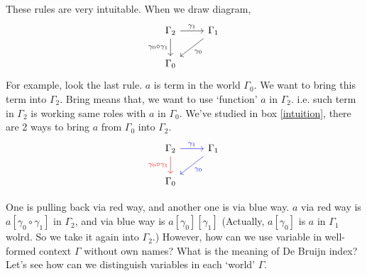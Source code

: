 \documentclass[12pt, a4paper, openany, twoside]{book}
\theoremstyle{definition}
\theoremstyle{remark}
\theoremstyle{plain}
\numberwithin{equation}{section}
\begin{document}
These rules are very intuitable. When we draw diagram, 
\[
\begin{tikzcd}
    \Gamma_2 \arrow[d, "\gamma_0 \circ \gamma_1"'] \arrow[r, "\gamma_1"] & \Gamma_1 \arrow[ld, "\gamma_0"] \\
    \Gamma_0
\end{tikzcd}
\]
For example, look the last rule. $a$ is term in the world $\Gamma_0$. We want to 
bring this term into $\Gamma_2$. Bring means that, we want to use \lq function' $a$ in $\Gamma_2$. i.e. such term in $\Gamma_2$ is 
working same roles with $a$ in $\Gamma_0$. We've studied in box \ref{intuition}, there are 2 ways to bring $a$ from $\Gamma_0$ into $\Gamma_2$. 
\[
\begin{tikzcd}
    \Gamma_2 \arrow[d, "\gamma_0 \circ \gamma_1"', red] \arrow[r, "\gamma_1", blue] & \Gamma_1 \arrow[ld, "\gamma_0", blue] \\
    \Gamma_0
\end{tikzcd}
\]

One is pulling back via red way, and another one is via blue way. $a$ via red way is $a[\gamma_0 \circ \gamma_1]$ in $\Gamma_2$, 
and via blue way is $a[\gamma_0][\gamma_1]$ (Actually, $a[\gamma_0]$ is $a$ in $\Gamma_1$ wolrd. So we take it again into $\Gamma_2$.)
However, how can we use variable in well-formed context $\Gamma$ without own names? What is the meaning of De Bruijn index? Let's see how can we distinguish
variables in each \lq world' $\Gamma$. 
\end{document}
